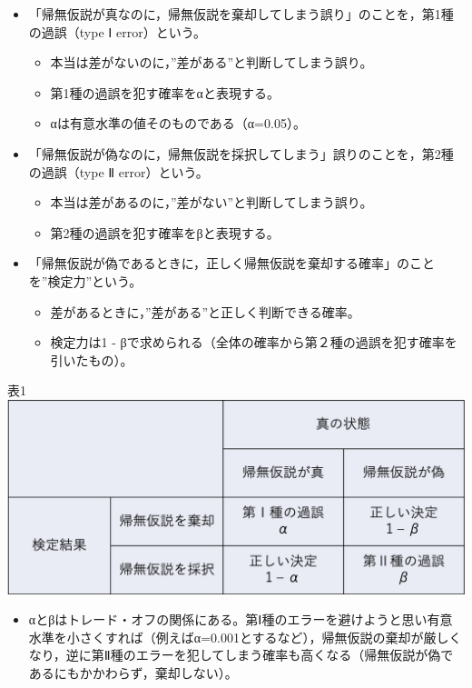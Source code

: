 \documentclass[]{article}
\providecommand{\tightlist}{%
  \setlength{\itemsep}{0pt}\setlength{\parskip}{0pt}}
\begin{document}
\begin{itemize}
\tightlist
\item
  「帰無仮説が真なのに，帰無仮説を棄却してしまう誤り」のことを，第1種の過誤（type
  Ⅰ error）という。

  \begin{itemize}
  \tightlist
  \item
    本当は差がないのに，''差がある''と判断してしまう誤り。
  \item
    第1種の過誤を犯す確率をαと表現する。
  \item
    αは有意水準の値そのものである（α=0.05）。
  \end{itemize}
\item
  「帰無仮説が偽なのに，帰無仮説を採択してしまう」誤りのことを，第2種の過誤（type
  Ⅱ error）という。

  \begin{itemize}
  \tightlist
  \item
    本当は差があるのに，''差がない''と判断してしまう誤り。
  \item
    第2種の過誤を犯す確率をβと表現する。
  \end{itemize}
\item
  「帰無仮説が偽であるときに，正しく帰無仮説を棄却する確率」のことを''検定力''という。

  \begin{itemize}
  \tightlist
  \item
    差があるときに，''差がある''と正しく判断できる確率。\\
  \item
    検定力は1 -
    βで求められる（全体の確率から第２種の過誤を犯す確率を引いたもの）。
  \end{itemize}
\end{itemize}

表1\\
\includegraphics{05_table01.png}

\begin{itemize}
\tightlist
\item
  αとβはトレード・オフの関係にある。第Ⅰ種のエラーを避けようと思い有意水準を小さくすれば（例えばα=0.001とするなど），帰無仮説の棄却が厳しくなり，逆に第Ⅱ種のエラーを犯してしまう確率も高くなる（帰無仮説が偽であるにもかかわらず，棄却しない）。
\end{itemize}
\end{document}
